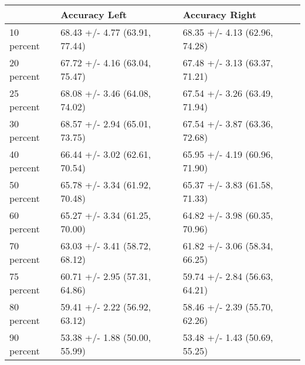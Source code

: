 \begin{tabular}{lll}
\toprule
{} &                  Accuracy Left &                 Accuracy Right \\
\midrule
10 percent &  68.43 +/- 4.77 (63.91, 77.44) &  68.35 +/- 4.13 (62.96, 74.28) \\
20 percent &  67.72 +/- 4.16 (63.04, 75.47) &  67.48 +/- 3.13 (63.37, 71.21) \\
25 percent &  68.08 +/- 3.46 (64.08, 74.02) &  67.54 +/- 3.26 (63.49, 71.94) \\
30 percent &  68.57 +/- 2.94 (65.01, 73.75) &  67.54 +/- 3.87 (63.36, 72.68) \\
40 percent &  66.44 +/- 3.02 (62.61, 70.54) &  65.95 +/- 4.19 (60.96, 71.90) \\
50 percent &  65.78 +/- 3.34 (61.92, 70.48) &  65.37 +/- 3.83 (61.58, 71.33) \\
60 percent &  65.27 +/- 3.34 (61.25, 70.00) &  64.82 +/- 3.98 (60.35, 70.96) \\
70 percent &  63.03 +/- 3.41 (58.72, 68.12) &  61.82 +/- 3.06 (58.34, 66.25) \\
75 percent &  60.71 +/- 2.95 (57.31, 64.86) &  59.74 +/- 2.84 (56.63, 64.21) \\
80 percent &  59.41 +/- 2.22 (56.92, 63.12) &  58.46 +/- 2.39 (55.70, 62.26) \\
90 percent &  53.38 +/- 1.88 (50.00, 55.99) &  53.48 +/- 1.43 (50.69, 55.25) \\
\bottomrule
\end{tabular}

